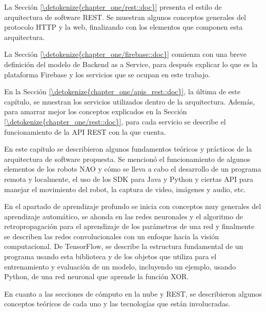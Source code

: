 \documentclass[letterpaper,12pt,spanish]{report}
\begin{document}
La Sección \ref{\detokenize{chapter_one/rest::doc}}
presenta el estilo de arquitectura de software REST.
Se muestran algunos conceptos generales del protocolo
HTTP y la web, finalizando con los elementos 
que componen esta arquitectura.

La Sección \ref{\detokenize{chapter_one/firebase::doc}}
comienza con una breve definición del modelo 
de Backend as a Service, para después
explicar lo que es la plataforma Firebase y los servicios
que se ocupan en este trabajo.

En la Sección \ref{\detokenize{chapter_one/apis_rest::doc}},
la última de este capítulo, se muestran los servicios
utilizados dentro de la arquitectura. Además,
para amarrar mejor los conceptos explicados 
en la Sección \ref{\detokenize{chapter_one/rest::doc}},
para cada servicio se describe el funcionamiento
de la API REST con la que cuenta.


% 
% 
% 
% 
% 
% 


En este capítulo se describieron algunos 
fundamentos teóricos y prácticos de la arquitectura de software 
propuesta. Se mencionó el funcionamiento de algunos elementos de los robots NAO y cómo se lleva a cabo el desarrollo de un programa
remota y localmente, el uso de los SDK para Java y Python y
ciertas API para manejar el movimiento del robot, la captura de 
video, imágenes y audio, etc. 

En el apartado de aprendizaje profundo se inicia con 
conceptos muy generales del aprendizaje automático,
se ahonda en las redes neuronales y el algoritmo de 
retropropagación para el aprendizaje de los parámetros
de una red y finalmente se describen las redes
convolucionales con un enfoque hacia la visión 
computacional. De TensorFlow, se describe 
la estructura fundamental de un programa usando esta
biblioteca y de los objetos que utiliza
para el entrenamiento y evaluación de un modelo, 
incluyendo un ejemplo, usando Python, de una
red neuronal que aprende la función XOR. 

En cuanto a las secciones de cómputo en la nube
y REST, se describieron algunos conceptos teóricos
de cada uno y las tecnologías que están involucradas.
\end{document}
